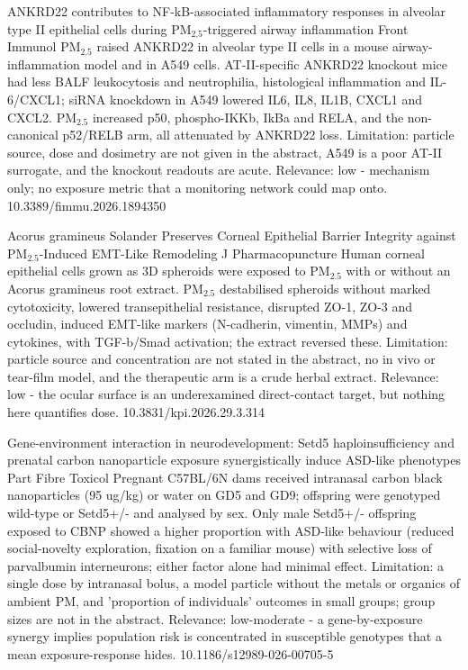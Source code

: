 \documentclass[10pt]{article}
\begin{document}
{ANKRD22 contributes to NF-kB-associated inflammatory responses in alveolar type II epithelial cells during PM$_{2.5}$-triggered airway inflammation}
{Front Immunol}
{PM$_{2.5}$ raised ANKRD22 in alveolar type II cells in a mouse airway-inflammation model and in A549 cells. AT-II-specific ANKRD22 knockout mice had less BALF leukocytosis and neutrophilia, histological inflammation and IL-6/CXCL1; siRNA knockdown in A549 lowered IL6, IL8, IL1B, CXCL1 and CXCL2. PM$_{2.5}$ increased p50, phospho-IKKb, IkBa and RELA, and the non-canonical p52/RELB arm, all attenuated by ANKRD22 loss. Limitation: particle source, dose and dosimetry are not given in the abstract, A549 is a poor AT-II surrogate, and the knockout readouts are acute. Relevance: low - mechanism only; no exposure metric that a monitoring network could map onto.}
{10.3389/fimmu.2026.1894350}

{Acorus gramineus Solander Preserves Corneal Epithelial Barrier Integrity against PM$_{2.5}$-Induced EMT-Like Remodeling}
{J Pharmacopuncture}
{Human corneal epithelial cells grown as 3D spheroids were exposed to PM$_{2.5}$ with or without an Acorus gramineus root extract. PM$_{2.5}$ destabilised spheroids without marked cytotoxicity, lowered transepithelial resistance, disrupted ZO-1, ZO-3 and occludin, induced EMT-like markers (N-cadherin, vimentin, MMPs) and cytokines, with TGF-b/Smad activation; the extract reversed these. Limitation: particle source and concentration are not stated in the abstract, no in vivo or tear-film model, and the therapeutic arm is a crude herbal extract. Relevance: low - the ocular surface is an underexamined direct-contact target, but nothing here quantifies dose.}
{10.3831/kpi.2026.29.3.314}

{Gene-environment interaction in neurodevelopment: Setd5 haploinsufficiency and prenatal carbon nanoparticle exposure synergistically induce ASD-like phenotypes}
{Part Fibre Toxicol}
{Pregnant C57BL/6N dams received intranasal carbon black nanoparticles (95 ug/kg) or water on GD5 and GD9; offspring were genotyped wild-type or Setd5+/- and analysed by sex. Only male Setd5+/- offspring exposed to CBNP showed a higher proportion with ASD-like behaviour (reduced social-novelty exploration, fixation on a familiar mouse) with selective loss of parvalbumin interneurons; either factor alone had minimal effect. Limitation: a single dose by intranasal bolus, a model particle without the metals or organics of ambient PM, and 'proportion of individuals' outcomes in small groups; group sizes are not in the abstract. Relevance: low-moderate - a gene-by-exposure synergy implies population risk is concentrated in susceptible genotypes that a mean exposure-response hides.}
{10.1186/s12989-026-00705-5}
\end{document}
